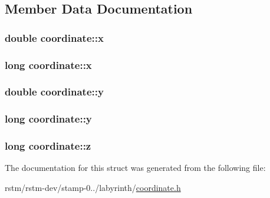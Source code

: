 \subsection{Member Data Documentation}
\hypertarget{structcoordinate_a3a164e660f2488a90d90f349d3b02010}{
\subsubsection[{x}]{\setlength{\rightskip}{0pt plus 5cm}double coordinate\-::x}}\label{structcoordinate_a3a164e660f2488a90d90f349d3b02010}
\hypertarget{structcoordinate_ab756588a9dc01e70d7f902a3430a0bb0}{
\subsubsection[{x}]{\setlength{\rightskip}{0pt plus 5cm}long coordinate\-::x}}\label{structcoordinate_ab756588a9dc01e70d7f902a3430a0bb0}
\hypertarget{structcoordinate_a11b4100f0f7449334bd3957db9be03cc}{
\subsubsection[{y}]{\setlength{\rightskip}{0pt plus 5cm}double coordinate\-::y}}\label{structcoordinate_a11b4100f0f7449334bd3957db9be03cc}
\hypertarget{structcoordinate_a5dd6bd0e1a7f277f92a6b7681aa5ca8c}{
\subsubsection[{y}]{\setlength{\rightskip}{0pt plus 5cm}long coordinate\-::y}}\label{structcoordinate_a5dd6bd0e1a7f277f92a6b7681aa5ca8c}
\hypertarget{structcoordinate_afe22e7b768c82077d06355c86c133c21}{
\subsubsection[{z}]{\setlength{\rightskip}{0pt plus 5cm}long coordinate\-::z}}\label{structcoordinate_afe22e7b768c82077d06355c86c133c21}


The documentation for this struct was generated from the following file\-:\begin{DoxyCompactItemize}
\item 
rstm/rstm-\/dev/stamp-\/0../labyrinth/\hyperlink{labyrinth_2coordinate_8h}{coordinate.\-h}\end{DoxyCompactItemize}
